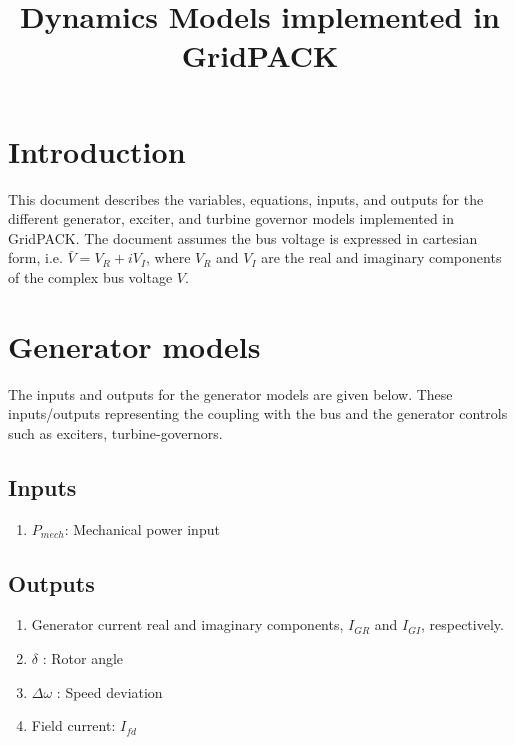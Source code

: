 \documentclass[12pt]{article}
\newcommand{\dw}{\Delta\omega}
\newcommand{\Pm}{P_{mech}}
\newcommand{\Ifd}{I_{fd}}
\begin{document}

\title{Dynamics Models implemented in GridPACK}

\maketitle

\section{Introduction}
This document describes the variables, equations, inputs, and outputs for the different generator, exciter, and turbine governor models implemented in GridPACK.
The document assumes the bus voltage is expressed in cartesian form, i.e. $\bar{V} = V_R + iV_I$, where
$V_R$ and $V_I$ are the real and imaginary components of the complex bus voltage $V$.

\section{Generator models}
The inputs and outputs for the generator models are given below. These inputs/outputs representing
the coupling with the bus and the generator controls such as exciters, turbine-governors.
\subsection{Inputs}
\begin{enumerate}
  \item $\Pm$: Mechanical power input
\end{enumerate}

\subsection{Outputs}
\begin{enumerate}
  \item Generator current real and imaginary components, $I_{GR}$ and $I_{GI}$, respectively.
  \item $\delta$ : Rotor angle
  \item $\dw$ : Speed deviation
  \item Field current: $\Ifd$
\end{enumerate}
\end{document}
